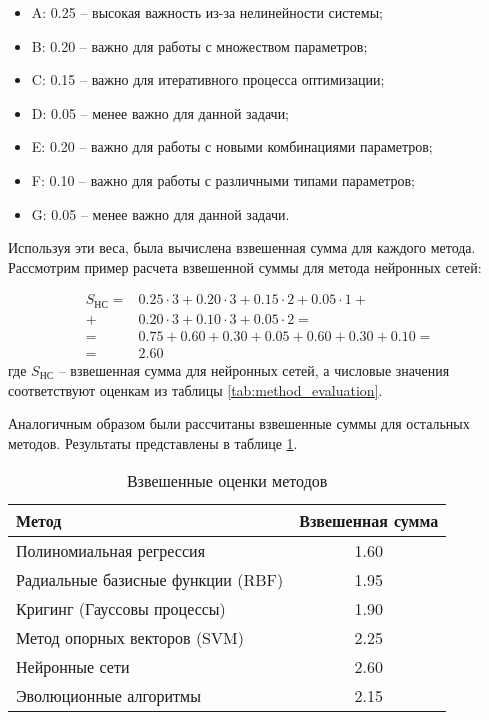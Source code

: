 \begin{itemize}
    \item A: 0.25 -- высокая важность из-за нелинейности системы;
    \item B: 0.20 -- важно для работы с множеством параметров;
    \item C: 0.15 -- важно для итеративного процесса оптимизации;
    \item D: 0.05 -- менее важно для данной задачи;
    \item E: 0.20 -- важно для работы с новыми комбинациями параметров;
    \item F: 0.10 -- важно для работы с различными типами параметров;
    \item G: 0.05 -- менее важно для данной задачи.
\end{itemize}

Используя эти веса, была вычислена взвешенная сумма для каждого метода. Рассмотрим пример расчета взвешенной суммы для метода нейронных сетей:

\begin{equation}
    \begin{split}
        S_{НС} = & 0.25 \cdot 3 + 0.20 \cdot 3 + 0.15 \cdot 2 + 0.05 \cdot 1 + \\
        +        & 0.20 \cdot 3 + 0.10 \cdot 3 + 0.05 \cdot 2 =                \\
        =        & 0.75 + 0.60 + 0.30 + 0.05 + 0.60 + 0.30 + 0.10 =            \\
        =        & 2.60
    \end{split}
\end{equation}
где $S_{НС}$ -- взвешенная сумма для нейронных сетей, а числовые значения
соответствуют оценкам из таблицы \ref{tab:method_evaluation}.

Аналогичным образом были рассчитаны взвешенные суммы для остальных методов.
Результаты представлены в таблице \ref{tab:weighted_scores}.

\begin{table}[h]
    \centering
    \caption{Взвешенные оценки методов}
    \begin{tabular}{|l|c|}
        \hline
        Метод                             & Взвешенная сумма \\
        \hline
        Полиномиальная регрессия          & 1.60             \\
        \hline
        Радиальные базисные функции (RBF) & 1.95             \\
        \hline
        Кригинг (Гауссовы процессы)       & 1.90             \\
        \hline
        Метод опорных векторов (SVM)      & 2.25             \\
        \hline
        Нейронные сети                    & 2.60             \\
        \hline
        Эволюционные алгоритмы            & 2.15             \\
        \hline
    \end{tabular}
    \label{tab:weighted_scores}
\end{table}



